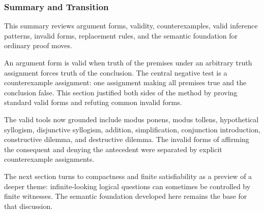 \subsubsection*{Summary and Transition}

\begin{remark*}
This summary reviews argument forms, validity, counterexamples, valid inference
patterns, invalid forms, replacement rules, and the semantic foundation for
ordinary proof moves.
\end{remark*}

\begin{remark*}[Exposition]
An argument form is valid when truth of the premises under an arbitrary truth
assignment forces truth of the conclusion. The central negative test is a
counterexample assignment: one assignment making all premises true and the
conclusion false. This section justified both sides of the method by proving
standard valid forms and refuting common invalid forms.
\end{remark*}

\begin{remark*}[Exposition]
The valid tools now grounded include modus ponens, modus tollens, hypothetical
syllogism, disjunctive syllogism, addition, simplification, conjunction
introduction, constructive dilemma, and destructive dilemma. The invalid forms
of affirming the consequent and denying the antecedent were separated by
explicit counterexample assignments.
\end{remark*}

\begin{remark*}[Transition]
The next section turns to compactness and finite satisfiability as a preview of
a deeper theme: infinite-looking logical questions can sometimes be controlled
by finite witnesses. The semantic foundation developed here remains the base for
that discussion.
\end{remark*}
